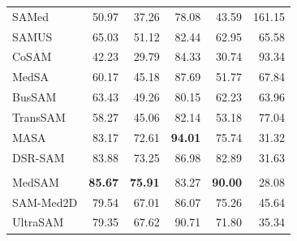 \documentclass[10pt]{article}
\begin{document}
{\begin{longtable}{lrrrrr}
SAMed & 50.97 & 37.26 & 78.08 & 43.59 & 161.15 \\
SAMUS & 65.03 & 51.12 & 82.44 & 62.95 & 65.58 \\
CoSAM & 42.23 & 29.79 & 84.33 & 30.74 & 93.34 \\
MedSA & 60.17 & 45.18 & 87.69 & 51.77 & 67.84 \\
BusSAM & 63.43 & 49.26 & 80.15 & 62.23 & 63.96 \\
TransSAM & 58.27 & 45.06 & 82.14 & 53.18 & 77.04 \\
MASA & 83.17 & 72.61 & \textbf{94.01} & 75.74 & 31.32 \\
DSR-SAM & 83.88 & 73.25 & 86.98 & 82.89 & 31.63 \\
\addlinespace[2pt]
\multicolumn{6}{l}{\textit{Zero-shot foundation models}} \\
MedSAM & \textbf{85.67} & \textbf{75.91} & 83.27 & \textbf{90.00} & 28.08 \\
SAM-Med2D & 79.54 & 67.01 & 86.07 & 75.26 & 45.64 \\
UltraSAM & 79.35 & 67.62 & 90.71 & 71.80 & 35.34 \\
\end{longtable}
}
\end{document}
